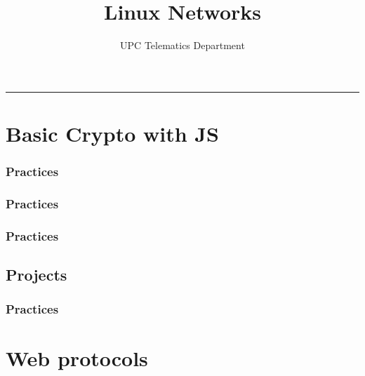 \documentclass[english,10pt]{book}
\author{UPC Telematics Department}
\title{Linux Networks}
\date{}
\makeatletter
\def\thickhrulefill{\leavevmode \leaders \hrule height 1pt\hfill \kern \z@}
\def\maketitle{%
	\null
	\thispagestyle{empty}%
	{\large \raggedleft \@textoA\par}
	\vfill
	\begin{center}\leavevmode
	\normalfont
	{\LARGE\raggedleft \@author\par}%
	\thickhrulefill\par
	{\huge\raggedright \@title\par}%
	\vskip 1cm
	\end{center}%
	\vfill
	{\large \@textoB\par}
	\null
	
	\clearpage
}
\makeatother
\begin{document}
\maketitle
\pagestyle{empty}

% 

\setcounter{tocdepth}{2}
\tableofcontents
\pagestyle{plain}


\chapter{Basic Crypto with JS \label{chap:basic-crypto-js}}


\subsection{Practices}



\subsection{Practices}



\subsection{Practices}


\section{Projects}
\subsection{Practices}






\chapter{Web protocols\label{chap:web-protocols}}

\end{document}

